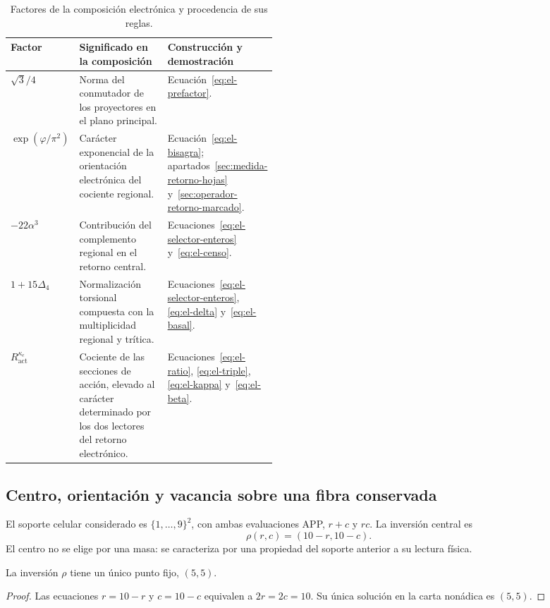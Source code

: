 \begin{table}[htbp]
\centering
\small
\setlength{\tabcolsep}{4pt}
\renewcommand{\arraystretch}{1.18}
\begin{tabularx}{\linewidth}{@{}p{0.20\linewidth}Xp{0.24\linewidth}@{}}
\toprule
Factor & Significado en la composición & Construcción y demostración\\
\midrule
\(\sqrt3/4\)
 & Norma del conmutador de los proyectores en el plano principal.
 & Ecuación~\eqref{eq:el-prefactor}.\\
\(\exp(\varphi/\pi^2)\)
 & Carácter exponencial de la orientación electrónica del cociente regional.
 & Ecuación~\eqref{eq:el-bisagra}; apartados~\ref{sec:medida-retorno-hojas}
   y~\ref{sec:operador-retorno-marcado}.\\
\(-22\alpha^3\)
 & Contribución del complemento regional en el retorno central.
 & Ecuaciones~\eqref{eq:el-selector-enteros} y~\eqref{eq:el-censo}.\\
\(1+15\Delta_4\)
 & Normalización torsional compuesta con la multiplicidad regional
   y trítica.
 & Ecuaciones~\eqref{eq:el-selector-enteros}, \eqref{eq:el-delta}
   y~\eqref{eq:el-basal}.\\
\(R_{\mathrm{act}}^{\kappa_e}\)
 & Cociente de las secciones de acción, elevado al carácter determinado
   por los dos lectores del retorno electrónico.
 & Ecuaciones~\eqref{eq:el-ratio}, \eqref{eq:el-triple},
   \eqref{eq:el-kappa} y~\eqref{eq:el-beta}.\\
\bottomrule
\end{tabularx}
\caption{Factores de la composición electrónica y procedencia de sus reglas.}
\label{tab:el-factores}
\end{table}



\subsection{Centro, orientación y vacancia sobre una fibra conservada}

El soporte celular considerado es \(\{1,\ldots,9\}^2\), con ambas
evaluaciones APP, \(r+c\) y \(rc\). La inversión central es
\begin{equation}
 \rho(r,c)=(10-r,10-c).
 \label{eq:el-inversion-central}
\end{equation}
El centro no se elige por una masa: se caracteriza por una propiedad del
soporte anterior a su lectura física.

\begin{proposition}
La inversión \(\rho\) tiene un único punto fijo, \((5,5)\).
\end{proposition}
\begin{proof}
Las ecuaciones \(r=10-r\) y \(c=10-c\) equivalen a
\(2r=2c=10\). Su única solución en la carta nonádica es \((5,5)\).
\end{proof}

